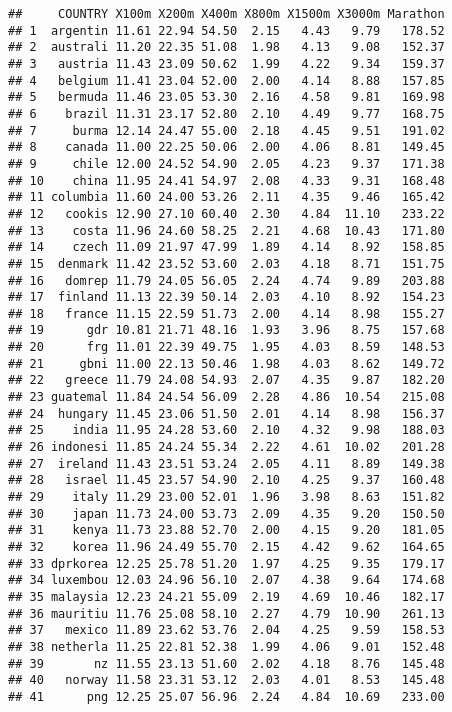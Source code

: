 \documentclass[
]{article}
\begin{document}
\begin{verbatim}
##     COUNTRY X100m X200m X400m X800m X1500m X3000m Marathon
## 1  argentin 11.61 22.94 54.50  2.15   4.43   9.79   178.52
## 2  australi 11.20 22.35 51.08  1.98   4.13   9.08   152.37
## 3   austria 11.43 23.09 50.62  1.99   4.22   9.34   159.37
## 4   belgium 11.41 23.04 52.00  2.00   4.14   8.88   157.85
## 5   bermuda 11.46 23.05 53.30  2.16   4.58   9.81   169.98
## 6    brazil 11.31 23.17 52.80  2.10   4.49   9.77   168.75
## 7     burma 12.14 24.47 55.00  2.18   4.45   9.51   191.02
## 8    canada 11.00 22.25 50.06  2.00   4.06   8.81   149.45
## 9     chile 12.00 24.52 54.90  2.05   4.23   9.37   171.38
## 10    china 11.95 24.41 54.97  2.08   4.33   9.31   168.48
## 11 columbia 11.60 24.00 53.26  2.11   4.35   9.46   165.42
## 12   cookis 12.90 27.10 60.40  2.30   4.84  11.10   233.22
## 13    costa 11.96 24.60 58.25  2.21   4.68  10.43   171.80
## 14    czech 11.09 21.97 47.99  1.89   4.14   8.92   158.85
## 15  denmark 11.42 23.52 53.60  2.03   4.18   8.71   151.75
## 16   domrep 11.79 24.05 56.05  2.24   4.74   9.89   203.88
## 17  finland 11.13 22.39 50.14  2.03   4.10   8.92   154.23
## 18   france 11.15 22.59 51.73  2.00   4.14   8.98   155.27
## 19      gdr 10.81 21.71 48.16  1.93   3.96   8.75   157.68
## 20      frg 11.01 22.39 49.75  1.95   4.03   8.59   148.53
## 21     gbni 11.00 22.13 50.46  1.98   4.03   8.62   149.72
## 22   greece 11.79 24.08 54.93  2.07   4.35   9.87   182.20
## 23 guatemal 11.84 24.54 56.09  2.28   4.86  10.54   215.08
## 24  hungary 11.45 23.06 51.50  2.01   4.14   8.98   156.37
## 25    india 11.95 24.28 53.60  2.10   4.32   9.98   188.03
## 26 indonesi 11.85 24.24 55.34  2.22   4.61  10.02   201.28
## 27  ireland 11.43 23.51 53.24  2.05   4.11   8.89   149.38
## 28   israel 11.45 23.57 54.90  2.10   4.25   9.37   160.48
## 29    italy 11.29 23.00 52.01  1.96   3.98   8.63   151.82
## 30    japan 11.73 24.00 53.73  2.09   4.35   9.20   150.50
## 31    kenya 11.73 23.88 52.70  2.00   4.15   9.20   181.05
## 32    korea 11.96 24.49 55.70  2.15   4.42   9.62   164.65
## 33 dprkorea 12.25 25.78 51.20  1.97   4.25   9.35   179.17
## 34 luxembou 12.03 24.96 56.10  2.07   4.38   9.64   174.68
## 35 malaysia 12.23 24.21 55.09  2.19   4.69  10.46   182.17
## 36 mauritiu 11.76 25.08 58.10  2.27   4.79  10.90   261.13
## 37   mexico 11.89 23.62 53.76  2.04   4.25   9.59   158.53
## 38 netherla 11.25 22.81 52.38  1.99   4.06   9.01   152.48
## 39       nz 11.55 23.13 51.60  2.02   4.18   8.76   145.48
## 40   norway 11.58 23.31 53.12  2.03   4.01   8.53   145.48
## 41      png 12.25 25.07 56.96  2.24   4.84  10.69   233.00

\end{verbatim}
\end{document}
